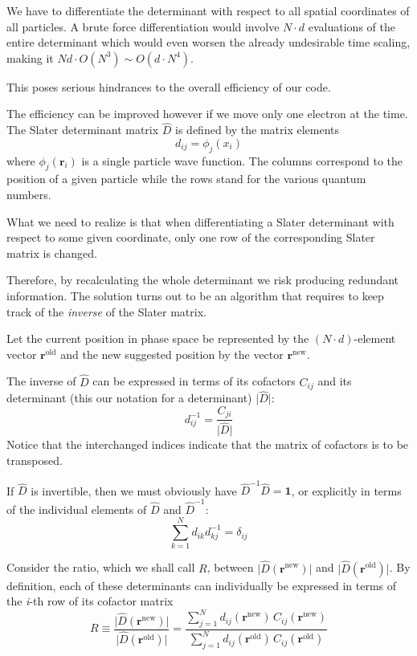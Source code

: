 \documentclass[%
oneside,                 %
final,                   %
10pt]{article}
\begin{document}
We have to differentiate the determinant with respect to
all spatial coordinates of all particles. A brute force
differentiation would involve $N\cdot d$ evaluations of the entire
determinant which would even worsen the already undesirable time
scaling, making it $Nd\cdot O(N^3)\sim O(d\cdot N^4)$.

This poses serious hindrances to the overall efficiency of our code.

The efficiency can be improved however if we move only one electron at the time.
The Slater determinant matrix $\hat{D}$ is defined by the matrix elements
\[
d_{ij}=\phi_j(x_i)
\]
where $\phi_j(\mathbf{r}_i)$ is a single particle  wave function.
The columns correspond to the position of a given particle 
while the rows stand for the various quantum numbers.

What we need to realize is that when differentiating a Slater
determinant with respect to some given coordinate, only one row of the
corresponding Slater matrix is changed. 

Therefore, by recalculating
the whole determinant we risk producing redundant information. The
solution turns out to be an algorithm that requires to keep track of
the \emph{inverse} of the Slater matrix.

Let the current position in phase space be represented by the $(N\cdot d)$-element 
vector $\mathbf{r}^{\mathrm{old}}$ and the new suggested
position by the vector $\mathbf{r}^{\mathrm{new}}$.

The inverse of $\hat{D}$ can be expressed in terms of its
cofactors $C_{ij}$ and its determinant (this our notation for a determinant) $\vert\hat{D}\vert$:
\begin{equation}
d_{ij}^{-1} = \frac{C_{ji}}{\vert\hat{D}\vert}
\label{eq:inverse_cofactor}
\end{equation}
Notice that the interchanged indices indicate that the matrix of cofactors is to be transposed.

If $\hat{D}$ is invertible, then we must obviously have $\hat{D}^{-1}\hat{D}= \mathbf{1}$, or explicitly in terms of the individual
elements of $\hat{D}$ and $\hat{D}^{-1}$:
\begin{equation}
\sum_{k=1}^N d_{ik}^{\phantom X}d_{kj}^{-1} = \delta_{ij}^{\phantom X}
\label{eq:unity_explicitely}
\end{equation}

Consider the ratio, which we shall call $R$, between $\vert\hat{D}(\mathbf{r}^{\mathrm{new}})\vert$ and $\vert\hat{D}(\mathbf{r}^{\mathrm{old}})\vert$. 
By definition, each of these determinants can
individually be expressed in terms of the \emph{i}-th row of its cofactor
matrix
\begin{equation}
R\equiv\frac{\vert\hat{D}(\mathbf{r}^{\mathrm{new}})\vert}
{\vert\hat{D}(\mathbf{r}^{\mathrm{old}})\vert} =
\frac{\sum_{j=1}^N d_{ij}(\mathbf{r}^{\mathrm{new}})\,
C_{ij}(\mathbf{r}^{\mathrm{new}})}
{\sum_{j=1}^N d_{ij}(\mathbf{r}^{\mathrm{old}})\,
C_{ij}(\mathbf{r}^{\mathrm{old}})}
\label{eq:detratio_cofactors}
\end{equation}
\end{document}
